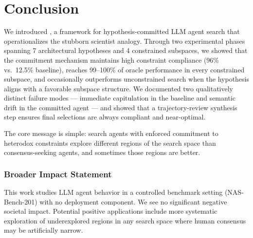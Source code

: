 \section{Conclusion}
\label{sec:conclusion}

We introduced \haas{}, a framework for hypothesis-committed LLM agent search
that operationalizes the stubborn scientist analogy. Through two experimental
phases spanning 7 architectural hypotheses and 4 \nasbench{} constrained
subspaces, we showed that the commitment mechanism maintains high constraint
compliance (96\% \haas{} vs.\ 12.5\% baseline), reaches 99--100\% of oracle
performance in every constrained subspace, and occasionally outperforms
unconstrained search when the hypothesis aligns with a favorable subspace
structure. We documented two qualitatively distinct failure modes --- immediate capitulation
in the baseline and semantic drift in the committed agent --- and showed that
a trajectory-review synthesis step ensures final selections are always compliant
and near-optimal.

The core message is simple: search agents with enforced commitment to heterodox
constraints explore different regions of the search space than consensus-seeking
agents, and sometimes those regions are better.

\subsubsection*{Broader Impact Statement}

This work studies LLM agent behavior in a controlled benchmark setting (NAS-Bench-201)
with no deployment component. We see no significant negative societal impact.
Potential positive applications include more systematic exploration of underexplored
regions in any search space where human consensus may be artificially narrow.
